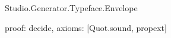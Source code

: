 \begin{lexlean}{Studio.Generator.Typeface.Envelope}
\begin{semanticmodule}
{  proof: decide{},
  axioms: [Quot.sound, propext]
}

\end{semanticmodule}
\end{lexlean}
